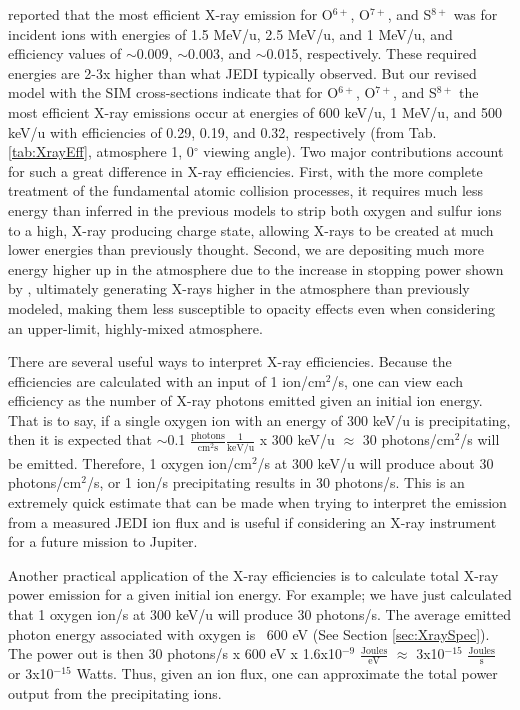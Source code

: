 \documentclass[draft]{agujournal2018}
\begin{document}
\citet{ozak2010} reported that the most efficient X-ray emission for O$^{6+}$, O$^{7+}$, and S$^{8+}$ was for incident ions with energies of 1.5 MeV/u, 2.5 MeV/u, and 1 MeV/u, and efficiency values of $\sim$0.009, $\sim$0.003, and $\sim$0.015, respectively.
These required energies are 2-3x higher than what JEDI typically observed.
But our revised model with the SIM cross-sections indicate that for O$^{6+}$, O$^{7+}$, and S$^{8+}$ the most efficient X-ray emissions occur at energies of 600 keV/u, 1 MeV/u, and 500 keV/u with efficiencies of 0.29, 0.19, and 0.32, respectively (from Tab. \ref{tab:XrayEff}, atmosphere 1, 0$^{\circ}$ viewing angle).
Two major contributions account for such a great difference in X-ray efficiencies.
First, with the more complete treatment of the fundamental atomic collision processes, it requires much less energy than inferred in the previous models to strip both oxygen and sulfur ions to a high, X-ray producing charge state, allowing X-rays to be created at much lower energies than previously thought.
Second, we are depositing much more energy higher up in the atmosphere due to the increase in stopping power shown by \citet{schultz2019}, ultimately generating X-rays higher in the atmosphere than previously modeled, making them less susceptible to opacity effects even when considering an upper-limit, highly-mixed atmosphere.

There are several useful ways to interpret X-ray efficiencies.
Because the efficiencies are calculated with an input of 1 ion/cm$^2$/s, one can view each efficiency as the number of X-ray photons emitted given an initial ion energy.
That is to say, if a single oxygen ion with an energy of 300 keV/u is precipitating, then it is expected that $\sim$0.1 $\frac{\mathrm{photons}}{\mathrm{cm}^2 \mathrm{s}}\frac{1}{\mathrm{keV/u}}$ x 300 keV/u $\approx$ 30 photons/cm$^2$/s will be emitted.
Therefore, 1 oxygen ion/cm$^2$/s at 300 keV/u will produce about 30 photons/cm$^2$/s, or 1 ion/s precipitating results in 30 photons/s.
This is an extremely quick estimate that can be made when trying to interpret the emission from a measured JEDI ion flux and is useful if considering an X-ray instrument for a future mission to Jupiter.

Another practical application of the X-ray efficiencies is to calculate total X-ray power emission for a given initial ion energy.
For example; we have just calculated that 1 oxygen ion/s at 300 keV/u will produce 30 photons/s.
The average emitted photon energy associated with oxygen is ~600 eV (See Section \ref{sec:XraySpec}).
The power out is then 30 photons/s x 600 eV x 1.6x10$^{-9}$ $\frac{\mathrm{Joules}}{\mathrm{eV}}$ $\approx$ 3x10$^{-15}$ $\frac{\mathrm{Joules}}{\mathrm{s}}$ or 3x10$^{-15}$ Watts.
Thus, given an ion flux, one can approximate the total power output from the precipitating ions.
\end{document}

